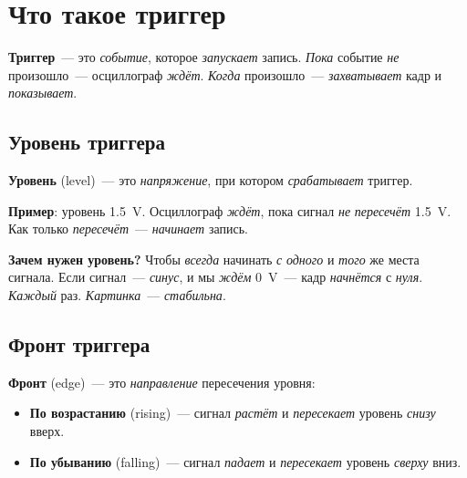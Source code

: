 \section{Что такое триггер}
\label{sec:trigger-what}

\textbf{Триггер}~--- это \emph{событие}, которое
\emph{запускает} запись. \emph{Пока} событие \emph{не}
произошло~--- осциллограф \emph{ждёт}. \emph{Когда}
произошло~--- \emph{захватывает} кадр и \emph{показывает}.

\subsection{Уровень триггера}

\textbf{Уровень} (level)~--- это \emph{напряжение}, при
котором \emph{срабатывает} триггер.

\textbf{Пример}: уровень \SI{1.5}{\volt}. Осциллограф
\emph{ждёт}, пока сигнал \emph{не} \emph{пересечёт}
\SI{1.5}{\volt}. Как только \emph{пересечёт}~--- \emph{начинает}
запись.

\begin{keybox}
\textbf{Зачем нужен уровень?} Чтобы \emph{всегда}
начинать \emph{с} \emph{одного} и \emph{того} же
места сигнала. Если сигнал~--- \emph{синус}, и мы
\emph{ждём} \SI{0}{\volt}~--- кадр \emph{начнётся}
с \emph{нуля}. \emph{Каждый} раз. \emph{Картинка}~---
\emph{стабильна}.
\end{keybox}

\subsection{Фронт триггера}

\textbf{Фронт} (edge)~--- это \emph{направление}
пересечения уровня:
\begin{itemize}
    \item \textbf{По возрастанию} (rising)~--- сигнал
          \emph{растёт} и \emph{пересекает} уровень \emph{снизу} вверх.
    \item \textbf{По убыванию} (falling)~--- сигнал
          \emph{падает} и \emph{пересекает} уровень \emph{сверху} вниз.
\end{itemize}

